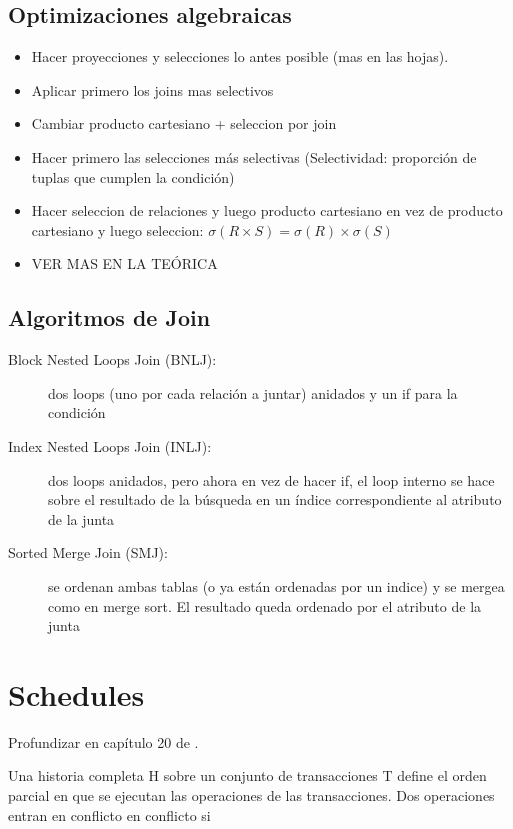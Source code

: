 \subsection{Optimizaciones algebraicas}

\begin{itemize}
	\item Hacer proyecciones y selecciones lo antes posible (mas en las hojas).
	\item Aplicar primero los joins mas selectivos
	\item Cambiar producto cartesiano + seleccion por join
	\item Hacer primero las selecciones más selectivas (Selectividad: proporción de tuplas que cumplen la condición)
	\item Hacer seleccion de relaciones y luego producto cartesiano en vez de producto cartesiano y luego seleccion: $\sigma(R \times S) = \sigma(R) \times \sigma(S)$
	\item VER MAS EN LA TEÓRICA
\end{itemize}

\subsection{Algoritmos de Join}

\begin{description}
	\item[Block Nested Loops Join (BNLJ):] dos loops (uno por cada relación a juntar) anidados y un if para la condición
	\item[Index Nested Loops Join (INLJ):] dos loops anidados, pero ahora en vez de hacer if, el loop interno se hace sobre el resultado de la búsqueda en un índice correspondiente al atributo de la junta
	\item[Sorted Merge Join (SMJ):] se ordenan ambas tablas (o ya están ordenadas por un indice) y se mergea como en merge sort. El resultado queda ordenado por el atributo de la junta
\end{description}

\section{Schedules}

Profundizar en capítulo 20 de \cite{elmasri2015}.

Una historia completa H sobre un conjunto de transacciones T define el orden parcial en que se ejecutan las operaciones de las transacciones.
Dos operaciones entran en conflicto en conflicto si

